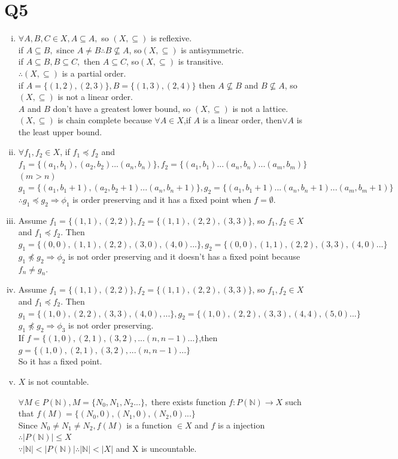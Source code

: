 \documentclass[12pt]{article}
\begin{document}
\section{Q5}
\begin{enumerate}[(i)]
\item
$\forall A,B,C\in X,A\subseteq A,$ so $(X,\subseteq)$ is reflexive.
\\if $A\subseteq B,$ since $A\neq B\therefore B\nsubseteq A$, so$(X,\subseteq)$ is antisymmetric.
\\if $A\subseteq B,B\subseteq C,$ then $A\subseteq C$, so$(X,\subseteq)$ is transitive.
\\$\therefore(X,\subseteq)$ is a partial order.
\\if $A=\{(1,2),(2,3)\}, B=\{(1,3),(2,4)\}$ then $A\nsubseteq B$ and $B\nsubseteq A$, so $(X,\subseteq)$ is not a linear order.
\\$A$ and $B$ don't have a greatest lower bound, so $(X,\subseteq)$ is not a lattice.
\\$(X,\subseteq)$ is chain complete because $\forall A\in X$,if $A$ is a linear order, then$\vee A$ is the least upper bound.
\item $\forall f_1,f_2\in X$, if $f_1\preceq f_2$ and $f_1=\{(a_1,b_1),(a_2,b_2)...(a_n,b_n)\},f_2=\{(a_1,b_1)...(a_n,b_n)...(a_m,b_m)\}$
\\$(m>n)$
\\$g_1=\{(a_1,b_1+1),(a_2,b_2+1)...(a_n,b_n+1)\},g_2=\{(a_1,b_1+1)...(a_n,b_n+1)...(a_m,b_m+1)\}$
\\$\therefore g_1\preceq g_2\Rightarrow\phi_1$ is order preserving and it  has a fixed point when $f=\emptyset$.
\item Assume $f_1=\{(1,1),(2,2)\},f_2=\{(1,1),(2,2),(3,3)\}$, so $ f_1,f_2\in X$ and $f_1\preceq f_2 $. Then $g_1=\{(0,0),(1,1),(2,2),(3,0),(4,0)...\},g_2=\{(0,0),(1,1),(2,2),(3,3),(4,0)...\}$ 	
\\$g_1\npreceq g_2\Rightarrow\phi_2$ is not order preserving and it doesn't has a fixed point because $f_n\neq g_n$.
\item  Assume $f_1=\{(1,1),(2,2)\},f_2=\{(1,1),(2,2),(3,3)\}$, so $ f_1,f_2\in X$ and $f_1\preceq f_2 $. Then $g_1=\{(1,0),(2,2),(3,3),(4,0),...\},g_2=\{(1,0),(2,2),(3,3),(4,4),(5,0)...\}$ 
\\$g_1\npreceq g_2\Rightarrow\phi_3$ is not order preserving. 
\\If $f=\{(1,0),(2,1),(3,2),...(n,n-1)...\}$,then $g=\{(1,0),(2,1),(3,2),...(n,n-1)...\}$
\\So it has a fixed point.
\item$X$ is not countable.
\par $\forall M\in P(\mathbb{N}),M=\{N_0,N_1,N_2...\},$ there exists function $f: P(\mathbb{N})\rightarrow X$ such that $f(M)=\{(N_0,0),(N_1,0),(N_2,0)...\}$
\\Since $N_0\neq N_1 \neq N_2,f(M)$ is a function $\in X$ and $f$ is a injection$\therefore|P(\mathbb{N})|\leq X$
\\$\because |\mathbb{N}|<|P(\mathbb{N})|\therefore |\mathbb{N}|<|X|$ and X is uncountable. 
\end{enumerate}
\end{document}
